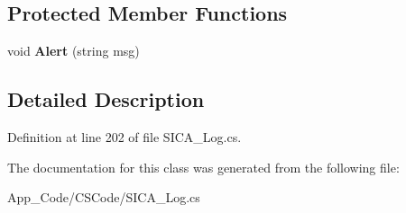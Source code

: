 \subsection*{Protected Member Functions}
\begin{DoxyCompactItemize}
\item 
void {\bfseries Alert} (string msg)\hypertarget{class_sica_segura_1_1_s_i_c_a___d_b_ae6261ea7cf251a75f418ea7dff1a0e62}{}\label{class_sica_segura_1_1_s_i_c_a___d_b_ae6261ea7cf251a75f418ea7dff1a0e62}

\end{DoxyCompactItemize}


\subsection{Detailed Description}


Definition at line 202 of file S\+I\+C\+A\+\_\+\+Log.\+cs.



The documentation for this class was generated from the following file\+:\begin{DoxyCompactItemize}
\item 
App\+\_\+\+Code/\+C\+S\+Code/S\+I\+C\+A\+\_\+\+Log.\+cs\end{DoxyCompactItemize}
